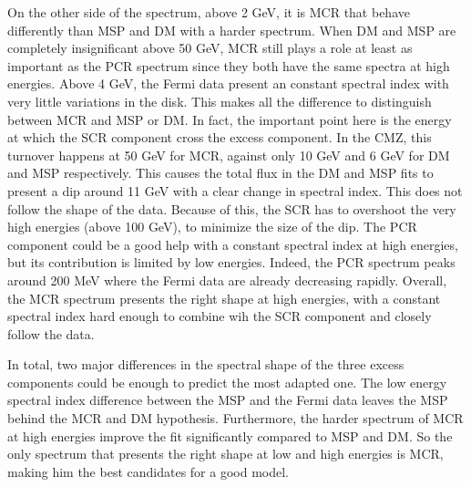 On the other side of the spectrum, above 2 GeV, it is MCR that behave differently than MSP and DM with a harder spectrum. When DM and MSP are completely insignificant above 50 GeV, MCR still plays a role at least as important as the PCR spectrum since they both have the same spectra at high energies. Above 4 GeV, the Fermi data present an constant spectral index with very little variations in the disk. This makes all the difference to distinguish between MCR and MSP or DM. In fact, the important point here is the energy at which the SCR component cross the excess component. In the CMZ, this turnover happens at 50 GeV for MCR, against only 10 GeV and 6 GeV for DM and MSP respectively. This causes the total flux in the DM and MSP fits to present a dip around 11 GeV with a clear change in spectral index. This does not follow the shape of the data. Because of this, the SCR has to overshoot the very high energies (above 100 GeV), to minimize the size of the dip. The PCR component could be a good help with a constant spectral index at high energies, but its contribution is limited by low energies. Indeed, the PCR spectrum peaks around 200 MeV where the Fermi data are already decreasing rapidly. Overall, the MCR spectrum presents the right shape at high energies, with a constant spectral index hard enough to combine wih the SCR component and closely follow the data.


In total, two major differences in the spectral shape of the three excess components could be enough to predict the most adapted one. The low energy spectral index difference between the MSP and the Fermi data leaves the MSP behind the MCR and DM hypothesis. Furthermore, the harder spectrum of MCR at high energies improve the fit significantly compared to MSP and DM. So the only spectrum that presents the right shape at low and high energies is MCR, making him the best candidates for a good model.


